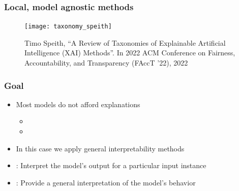 \begin{frame}
  \frametitle{Local, model agnostic methods}
  \begin{figure}
    \texttt{[image: taxonomy\_speith]}
    \caption{\footnotesize Timo Speith, ``A Review of Taxonomies of Explainable
      Artificial Intelligence (XAI) Methods''. In 2022 ACM Conference on
      Fairness, Accountability, and Transparency (FAccT '22), 2022}
  \end{figure}
\end{frame}

\begin{frame}
  \frametitle{Goal}
  \begin{itemize}
  \item Most models do not afford explanations 
    \begin{itemize}
    \item {}
    \item {}
    \end{itemize}
  \item In this case we apply general interpretability methods
  \item {}: Interpret the model's output for a particular input instance
  \item {}: Provide a general interpretation of the model's behavior
  \end{itemize}
\end{frame}

